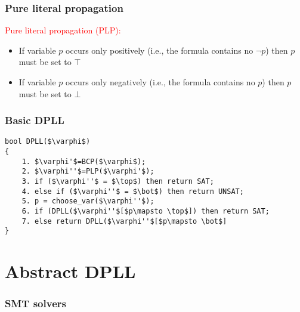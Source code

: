 \documentclass[smaller]{beamer}
\newcommand{\red}[1]{\textcolor{red}{#1}}
\begin{document}
\begin{frame}
\frametitle{Pure literal propagation}
\red{Pure literal propagation (PLP):}
\vspace{4mm}
\begin{itemize}
\setlength\itemsep{4mm}
\item If variable $p$ occurs only positively (i.e., the formula contains no $\neg p$) then
$p$ must be set to $\top$
\item If variable $p$ occurs only negatively (i.e., the formula contains no $p$) then
$p$ must be set to $\bot$
\end{itemize}
\end{frame}

\begin{frame}[fragile]
\frametitle{Basic DPLL}
\begin{lstlisting}[mathescape]
bool DPLL($\varphi$) 
{
    1. $\varphi'$=BCP($\varphi$);
    2. $\varphi''$=PLP($\varphi'$);
    3. if ($\varphi''$ = $\top$) then return SAT;
    4. else if ($\varphi''$ = $\bot$) then return UNSAT;
    5. p = choose_var($\varphi''$);
    6. if (DPLL($\varphi''$[$p\mapsto \top$]) then return SAT;
    7. else return DPLL($\varphi''$[$p\mapsto \bot$]
}
\end{lstlisting}
\end{frame}


\section{Abstract DPLL}

\begin{frame}
\frametitle{SMT solvers}
\tableofcontents[currentsection]
\end{frame}
\end{document}
